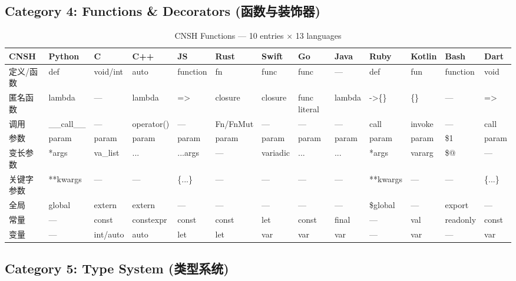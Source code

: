 \subsection{Category 4: Functions \& Decorators (函数与装饰器)}
\label{app:ren-functions}

\begin{table}[h]
\centering
\caption{CNSH Functions — 10 entries × 13 languages}
\renewcommand{\arraystretch}{1.2}
\fontsize{8}{10}\selectfont
\begin{tabular}{lllllllllllll}
\toprule
\textbf{CNSH} & \textbf{Python} & \textbf{C} & \textbf{C++} & \textbf{JS} & \textbf{Rust} & \textbf{Swift} & \textbf{Go} & \textbf{Java} & \textbf{Ruby} & \textbf{Kotlin} & \textbf{Bash} & \textbf{Dart} \\
\midrule
定义/函数 & def & void/int & auto & function & fn & func & func & — & def & fun & function & void \\
匿名函数 & lambda & — & lambda & => & closure & closure & func literal & lambda & ->\{\} & \{\} & — & => \\
调用 & \_\_call\_\_ & — & operator() & — & Fn/FnMut & — & — & — & call & invoke & — & call \\
参数 & param & param & param & param & param & param & param & param & param & param & \$1 & param \\
变长参数 & *args & va\_list & ... & ...args & — & variadic & ... & ... & *args & vararg & \$@ & — \\
关键字参数 & **kwargs & — & — & \{...\} & — & — & — & — & **kwargs & — & — & \{...\} \\
全局 & global & extern & extern & — & — & — & — & — & \$global & — & export & — \\
常量 & — & const & constexpr & const & const & let & const & final & — & val & readonly & const \\
变量 & — & int/auto & auto & let & let & var & var & var & — & var & — & var \\
\bottomrule
\end{tabular}
\end{table}

\subsection{Category 5: Type System (类型系统)}
\label{app:ren-types}

